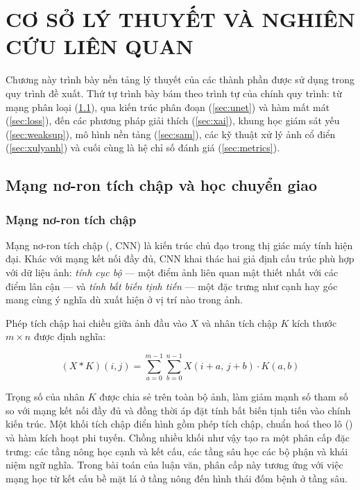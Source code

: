 \chapter{CƠ SỞ LÝ THUYẾT VÀ NGHIÊN CỨU LIÊN QUAN}
\label{chap:cosolythuyet}

Chương này trình bày nền tảng lý thuyết của các thành phần được sử dụng trong quy
trình đề xuất. Thứ tự trình bày bám theo trình tự của chính quy trình: từ mạng
phân loại (\cref{sec:cnn}), qua kiến trúc phân đoạn (\cref{sec:unet}) và hàm mất
mát (\cref{sec:loss}), đến các phương pháp giải thích (\cref{sec:xai}), khung học
giám sát yếu (\cref{sec:weaksup}), mô hình nền tảng \SAM{} (\cref{sec:sam}), các
kỹ thuật xử lý ảnh cổ điển (\cref{sec:xulyanh}) và cuối cùng là hệ chỉ số đánh
giá (\cref{sec:metrics}).

\section{Mạng nơ-ron tích chập và học chuyển giao}
\label{sec:cnn}

\subsection{Mạng nơ-ron tích chập}

Mạng nơ-ron tích chập (, CNN) là kiến trúc chủ
đạo trong thị giác máy tính hiện đại. Khác với mạng kết nối đầy đủ, CNN khai thác
hai giả định cấu trúc phù hợp với dữ liệu ảnh: \emph{tính cục bộ} --- một điểm
ảnh liên quan mật thiết nhất với các điểm lân cận --- và \emph{tính bất biến tịnh
tiến} --- một đặc trưng như cạnh hay góc mang cùng ý nghĩa dù xuất hiện ở vị trí
nào trong ảnh.

Phép tích chập hai chiều giữa ảnh đầu vào $X$ và nhân tích chập $K$ kích thước
$m \times n$ được định nghĩa:

\begin{equation}
    (X * K)(i, j) = \sum_{a=0}^{m-1} \sum_{b=0}^{n-1} X(i + a,\, j + b) \cdot K(a, b)
    \label{eq:convolution}
\end{equation}

Trọng số của nhân $K$ được chia sẻ trên toàn bộ ảnh, làm giảm mạnh số tham số so
với mạng kết nối đầy đủ và đồng thời áp đặt tính bất biến tịnh tiến vào chính kiến
trúc. Một khối tích chập điển hình gồm phép tích chập, chuẩn hoá theo lô
() và hàm kích hoạt phi tuyến. Chồng nhiều khối như vậy
tạo ra một phân cấp đặc trưng: các tầng nông học cạnh và kết cấu, các tầng sâu học
các bộ phận và khái niệm ngữ nghĩa. Trong bài toán của luận văn, phân cấp này
tương ứng với việc mạng học từ kết cấu bề mặt lá ở tầng nông đến hình thái đốm
bệnh ở tầng sâu.

